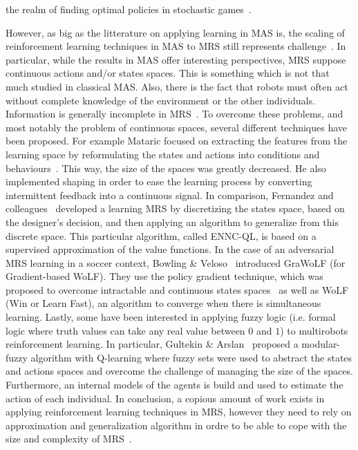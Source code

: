 the realm of finding optimal policies in stochastic games~\cite{Littman1994, Claus1998, Bowling2003, Greenwald2005, Kapetanakis2005}.

    However, as big as the litterature on applying learning in MAS is, the scaling of reinforcement learning techniques in MAS to MRS still represents challenge~\cite{Yang2005}. In particular, while the results in MAS offer interesting perspectives, MRS suppose continuous actions and/or states spaces. This is something which is not that much studied in classical MAS. Also, there is the fact that robots must often act without complete knowledge of the environment or the other individuals. Information is generally incomplete in MRS~\cite{Yang2005, Fernandez2005}. To overcome these problems, and most notably the problem of continuous spaces, several different techniques have been proposed. For example Mataric focused on extracting the features from the learning space by reformulating the states and actions into conditions and behaviours~\cite{Mataric1997}. This way, the size of the spaces was greatly decreased. He also implemented shaping in order to ease the learning process by converting intermittent feedback into a continuous signal. In comparison, Fernandez and colleagues~\cite{Fernandez2005} developed a learning MRS by discretizing the states space, based on the designer's decision, and then applying an algorithm to generalize from this discrete space. This particular algorithm, called ENNC-QL, is based on a supervised approximation of the value functions. In the case of an adversarial MRS learning in a soccer context, Bowling & Veloso~\cite{Bowling2003} introduced GraWoLF (for Gradient-based WoLF). They use the policy gradient technique, which was proposed to overcome intractable and continuous states spaces~\cite{Sutton2000} as well as WoLF (Win or Learn Fast), an algorithm to converge when there is simultaneous learning. Lastly, some have been interested in applying fuzzy logic (i.e. formal logic where truth values can take any real value between $0$ and $1$) to multirobots reinforcement learning. In particular, Gultekin & Arslan~\cite{Gultekin2002} proposed a modular-fuzzy algorithm with Q-learning where fuzzy sets were used to abstract the states and actions spaces and overcome the challenge of managing the size of the spaces. Furthermore, an internal models of the agents is build and used to estimate the action of each individual. In conclusion, a copious amount of work exists in applying reinforcement learning techniques in MRS, however they need to rely on approximation and generalization algorithm in ordre to be able to cope with the size and complexity of MRS~\cite{Yang2005, Parker2008}.

